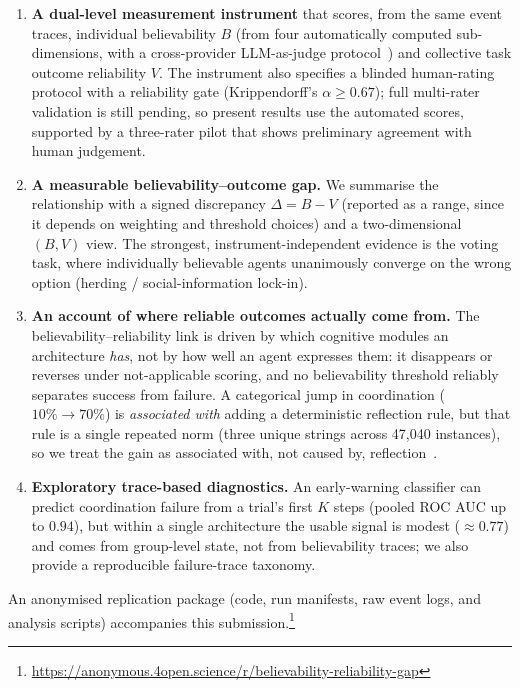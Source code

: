 \documentclass[runningheads]{llncs}
\begin{document}
\begin{enumerate}
  \item \textbf{A dual-level measurement instrument} that scores, from the same event
  traces, individual believability $B$ (from four automatically computed sub-dimensions,
  with a cross-provider LLM-as-judge protocol~\cite{zheng2023judging}) and collective task
  outcome reliability $V$. The instrument also specifies a blinded human-rating protocol
  with a reliability gate (Krippendorff's $\alpha\geq0.67$); full multi-rater validation is
  still pending, so present results use the automated scores, supported by a three-rater
  pilot that shows preliminary agreement with human judgement.
  \item \textbf{A measurable believability--outcome gap.} We summarise the relationship
  with a signed discrepancy $\Delta=B-V$ (reported as a range, since it depends on
  weighting and threshold choices) and a two-dimensional $(B,V)$ view. The strongest,
  instrument-independent evidence is the voting task, where individually believable agents
  unanimously converge on the wrong option (herding / social-information lock-in).
  \item \textbf{An account of where reliable outcomes actually come from.} The
  believability--reliability link is driven by which cognitive modules an architecture
  \emph{has}, not by how well an agent expresses them: it disappears or reverses under
  not-applicable scoring, and no believability threshold reliably separates success from
  failure. A categorical jump in coordination ($10\%\rightarrow70\%$) is \emph{associated
  with} adding a deterministic reflection rule, but that rule is a single repeated norm
  (three unique strings across 47{,}040 instances), so we treat the gain as associated
  with, not caused by, reflection~\cite{aharon2026tacit}.
  \item \textbf{Exploratory trace-based diagnostics.} An early-warning classifier can
  predict coordination failure from a trial's first $K$ steps (pooled ROC AUC up to
  $0.94$), but within a single architecture the usable signal is modest ($\approx0.77$) and
  comes from group-level state, not from believability traces; we also provide a
  reproducible failure-trace taxonomy.
\end{enumerate}
\noindent An anonymised replication package (code, run manifests, raw event logs, and
analysis scripts) accompanies this submission.\footnote{\url{https://anonymous.4open.science/r/believability-reliability-gap}}%
\end{document}
